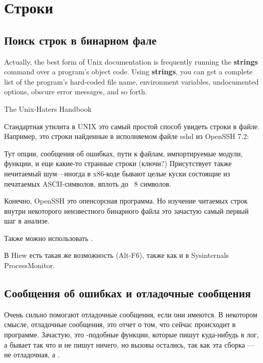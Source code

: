 \section{Строки}
\label{sec:digging_strings}



\subsection{Поиск строк в бинарном фале}

\epigraph{Actually, the best form of Unix documentation is frequently running the
\textbf{strings} command over a program’s object code. Using \textbf{strings}, you can get
a complete list of the program’s hard-coded file name, environment variables,
undocumented options, obscure error messages, and so forth.}{The Unix-Haters Handbook}

Стандартная утилита в UNIX  это самый простой способ увидеть строки в файле.
Например, это строки найденные в исполняемом файле sshd из OpenSSH 7.2:



Тут опции, сообщения об ошибках, пути к файлам, импортируемые модули, функции, и еще какие-то странные строки (ключи?)
Присутствует также нечитаемый шум---иногда в x86-коде бывают целые куски состоящие из печатаемых ASCII-символов,
вплоть до ~8 символов.

Конечно, OpenSSH это опенсорсная программа.
Но изучение читаемых строк внутри некоторого неизвестного бинарного файла это зачастую самый первый шаг в анализе.

Также можно использовать .

В Hiew есть такая же возможность (Alt-F6), также как и в Sysinternals ProcessMonitor.

\subsection{Сообщения об ошибках и отладочные сообщения}

Очень сильно помогают отладочные сообщения, если они имеются. В некотором смысле, отладочные сообщения, 
это отчет о том, что сейчас происходит в программе.
Зачастую, это \printf-подобные функции, 
которые пишут куда-нибудь в лог, а бывает так что и не пишут ничего, но вызовы остались, так как эта сборка --- не
отладочная, а .

